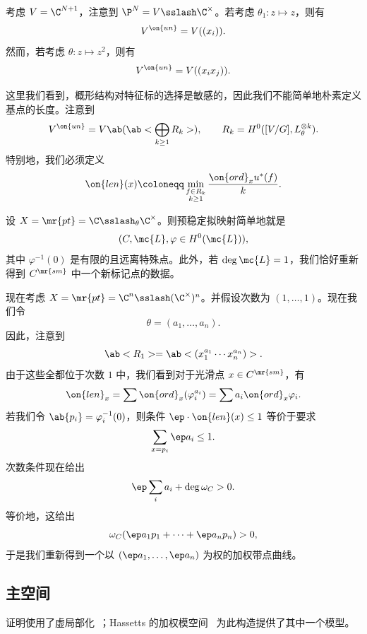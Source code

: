 \begin{exm}
    考虑 \(V = \C^{N+1}\)，注意到 \(\P^N = V \sslash \C^{\times}\)。若考虑 \(\theta_1 \colon z \mapsto z\)，则有 
    \[ V^{\on{un}} = V((x_i)). \]
    然而，若考虑 \(\theta \colon z \mapsto z^2\)，则有
    \[ V^{\on{un}} = V((x_i x_j)). \]
\end{exm}

这里我们看到，概形结构对特征标的选择是敏感的，因此我们不能简单地朴素定义基点的长度。注意到
\[ V^{\on{un}} = V\ab(\ab< \bigoplus_{k \geq 1} R_k>), \qquad R_k = H^0([V/G], L_{\theta}^{\otimes k}). \]
特别地，我们必须定义
\[ \on{len}(x) \coloneqq \min_{\substack{f \in R_k \\ k \geq 1}} \frac{\on{ord}_x u^*(f)}{k}. \]

\begin{exm}
    设 \(X = \mr{pt} = \C \sslash_{\theta} \C^{\times}\)。则预稳定拟映射简单地就是
    \[ (C, \mc{L}, \varphi \in H^0(\mc{L})), \]
    其中 \(\varphi^{-1}(0)\) 是有限的且远离特殊点。此外，若 \(\deg \mc{L} = 1\)，我们恰好重新得到 \(C^{\mr{sm}}\) 中一个新标记点的数据。
\end{exm}

\begin{exm}
    现在考虑 \(X = \mr{pt} = \C^n \sslash (\C^{\times})^n\)。并假设次数为 \((1, \ldots, 1)\)。现在我们令
    \[ \theta = (a_1, \ldots, a_n). \]
    因此，注意到
    \[ \ab<R_1> = \ab<(x_1^{a_1} \cdots x_n^{a_n})>. \]
    由于这些全都位于次数 \(1\) 中，我们看到对于光滑点 \(x \in C^{\mr{sm}}\)，有
    \[ \on{len}_x = \sum \on{ord}_x (\varphi_i^{a_i}) = \sum a_i \on{ord}_x \varphi_i. \]
    若我们令 \(\ab\{p_i\} = \varphi_i^{-1}(0)\)，则条件 \(\ep \cdot \on{len}(x) \leq 1\) 等价于要求
    \[ \sum_{x = p_i} \ep a_i \leq 1. \]
    次数条件现在给出
    \[ \ep \sum_i a_i + \deg \omega_C > 0. \]
    等价地，这给出
    \[ \omega_C(\ep a_1 p_1 + \cdots + \ep a_n p_n) > 0, \]
    于是我们重新得到一个以 \((\ep a_1, \ldots, \ep a_n)\) 为权的加权带点曲线。
\end{exm}

\subsection{主空间}%
\label{sub:Master space}

证明使用了虚局部化~\cite{GP1999}；Hassett\textquotesingle s 的加权模空间~\cite{Hassett2003} 为此构造提供了其中一个模型。

